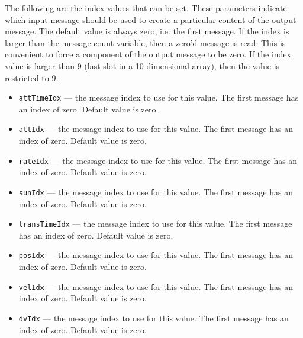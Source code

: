 The following are the index values that can be set.  These parameters indicate which input message should be used to create a particular content of the output message.  The default value is always zero, i.e. the first message.  If the index is larger than the message count variable, then a zero'd message is read.  This is convenient to force a component of the output message to be zero. If the index value is larger than 9 (last slot in a 10 dimensional array), then the value is restricted to 9.  
\begin{itemize}
	\item {\tt attTimeIdx} --- the message index to use for this value.  The first message has an index of zero. Default value is zero.
	\item {\tt attIdx} --- the message index to use for this value.  The first message has an index of zero. Default value is zero.
	\item {\tt rateIdx} --- the message index to use for this value.  The first message has an index of zero. Default value is zero.
	\item {\tt sunIdx} --- the message index to use for this value.  The first message has an index of zero. Default value is zero.
	\item {\tt transTimeIdx} --- the message index to use for this value.  The first message has an index of zero. Default value is zero.
	\item {\tt posIdx} --- the message index to use for this value.  The first message has an index of zero. Default value is zero.
	\item {\tt velIdx} --- the message index to use for this value.  The first message has an index of zero. Default value is zero.
	\item {\tt dvIdx} --- the message index to use for this value.  The first message has an index of zero. Default value is zero.
\end{itemize}
